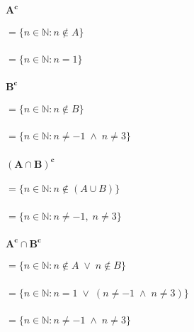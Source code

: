 \paragraph{$\mathbf{A^c}$}
	
	\subparagraph{$= \{n \in \mathbb{N} : n \notin A\}$}
	\subparagraph{$= \{n \in \mathbb{N} : n = 1\}$}
\newpage		
\paragraph{$\mathbf{B^c}$}
	\subparagraph{$= \{n \in \mathbb{N} : n \notin B\}$}
	\subparagraph{$= \{n \in \mathbb{N} :n \neq -1 \; \wedge \; n \neq 3\}$}
\paragraph{$\mathbf{(A\cap B)^c}$}
	
	\subparagraph{$= \{n \in \mathbb{N} : n \notin (A \cup B)\}$}
	\subparagraph{$= \{n \in \mathbb{N} : n \neq -1,\; n \neq 3\}$}
	
\paragraph{$\mathbf{A^c \cap B^c}$}
	\subparagraph{$= \{n \in \mathbb{N} : n \notin A \; \vee \; n \notin B\}$}
	\subparagraph{$= \{n \in \mathbb{N} :n = 1 \; \vee \; (n \neq -1  \; \wedge \; n \neq 3)\}$}
	\subparagraph{$= \{n \in \mathbb{N} : n \neq -1 \; \wedge \; n \neq 3\}$}
